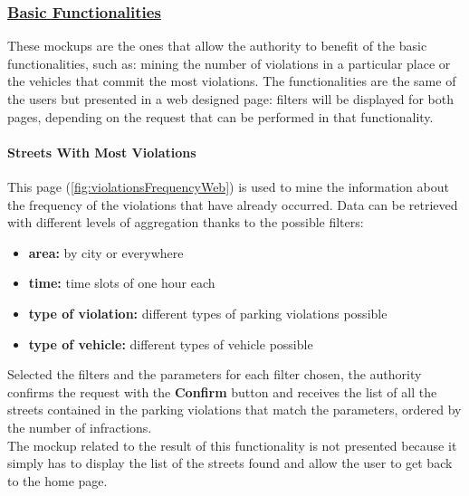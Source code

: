 				\newpage
			
			\subsubsection[Basic Functionalities]{\hyperlink{toc}{Basic Functionalities}}
				\label{sec:authorityBasicFunctionalities}
				
				These mockups are the ones that allow the authority to benefit of the basic functionalities, such as: mining the number of violations in a particular place or the vehicles that commit the most violations. The functionalities are the same of the users but presented in a web designed page: filters will be displayed for both pages, depending on the request that can be performed in that functionality.
				
				\paragraph{Streets With Most Violations}
				This page (\autoref{fig:violationsFrequencyWeb}) is used to mine the information about the frequency of the violations that have already occurred. Data can be retrieved with different levels of aggregation thanks to the possible filters:
				
				\begin{itemize}
					\item \textbf{area:} by city or everywhere
					\item \textbf{time:} time slots of one hour each
					\item \textbf{type of violation:} different types of parking violations possible
					\item \textbf{type of vehicle:} different types of vehicle possible
				\end{itemize}
			
				Selected the filters and the parameters for each filter chosen, the authority confirms the request with the \textbf{Confirm} button and receives the list of all the streets contained in the parking violations  that match the parameters, ordered by the number of infractions.\\
				
				The mockup related to the result of this functionality is not presented because it simply has to display the list of the streets found and allow the user to get back to the home page.
				
				\vspace{0.1cm}
				
